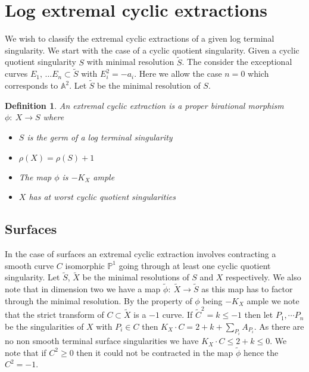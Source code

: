 \documentclass[11pt]{amsart}
\theoremstyle{plain}
\newtheorem{dfn}[thm]{Definition}
\newcommand{\mb}[1]{\mathbb{#1}}
\newcommand{\ra}{\rightarrow}
\newcommand{\wt}[1]{\widetilde{#1}}
\begin{document}
 


\section{Log extremal cyclic extractions}


We wish to classify the extremal cyclic extractions of a given log terminal singularity. We start with the case of a cyclic quotient singularity. Given a cyclic quotient singularity $S$ with minimal resolution $\wt{S}$. The consider the exceptional curves $E_1, \,  \dots E_n \subset \wt{S}$ with $E_i^2 = -a_i$. Here we allow the case $n=0$ which corresponds to $\mathbb{A}^2$. Let $\widetilde{S}$ be the minimal resolution of $S$.

\begin{dfn}
An \emph{extremal cyclic extraction} is a proper birational morphism $\phi : \: X \ra S$ where
\begin{itemize}

\item $S$ is the germ of a log terminal singularity
\item $\rho(X) = \rho(S) + 1$
\item The map $\phi$ is $-K_X$ ample
\item $X$ has at worst cyclic quotient singularities
\end{itemize}
\end{dfn}
 
 \subsection{Surfaces}
 
In the case of surfaces an extremal cyclic extraction involves contracting a smooth curve $C$ isomorphic $\mb{P}^1$ going through at least one cyclic quotient singularity. Let $\wt{S}$, $\wt{X}$ be the minimal resolutions of $S$ and $X$ respectively. We also note that in dimension two we have a map $\wt{\phi} : \: \wt{X} \ra \wt{S}$ as this map has to factor through the minimal resolution. By the property of $\phi$ being $-K_X$ ample we note that the strict transform of $C \subset \wt{X}$ is a $-1$ curve. If $\wt{C}^2 = k \le -1$ then let $P_1, \cdots P_n$ be the singularities of $X$ with $P_i \in C$ then $K_X \cdot C  = 2 + k + \sum_{P_i} A_{P_i} $. As there are no non smooth terminal surface singularities we have $K_X \cdot C \le 2+ k \leq 0$. We note that if $C^2 \geq 0$ then it could not be contracted in the map $\wt{\phi}$ hence the $C^2 = -1$.
 
\end{document}

